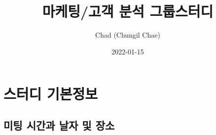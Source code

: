 \documentclass[
]{book}
\title{마케팅/고객 분석 그룹스터디}
\author{Chad (Chungil Chae)}
\date{2022-01-15}
\begin{document}
\maketitle

{
\setcounter{tocdepth}{1}
\tableofcontents
}
\hypertarget{uxc2a4uxd130uxb514-uxae30uxbcf8uxc815uxbcf4}{%
\chapter{스터디 기본정보}\label{uxc2a4uxd130uxb514-uxae30uxbcf8uxc815uxbcf4}}

\hypertarget{uxbbf8uxd305-uxc2dcuxac04uxacfc-uxb0a0uxc790-uxbc0f-uxc7a5uxc18c}{%
\section{미팅 시간과 날자 및 장소}\label{uxbbf8uxd305-uxc2dcuxac04uxacfc-uxb0a0uxc790-uxbc0f-uxc7a5uxc18c}}
\end{document}

